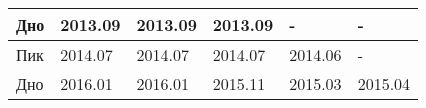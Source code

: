 \documentclass[a4paper,14pt]{extreport}
\begin{document}
\begin{table}[]
\begin{tabular}{|l|l|l|l|l|l|}
				Дно                                                                                                   & 2013.09                                                                                                                                                    & 2013.09                                                                    & 2013.09                                                                          & -                                                                         & -                                                                                \\ \hline
				Пик                                                                                                   & 2014.07                                                                                                                                                    & 2014.07                                                                    & 2014.07                                                                          & 2014.06                                                                   & -                                                                                \\
				Дно                                                                                                   & 2016.01                                                                                                                                                    & 2016.01                                                                    & 2015.11                                                                          & 2015.03                                                                   & 2015.04                                                                          \\ \hline
			\end{tabular}
		\label{tbl:tpoints_re}	
	\end{table}
	
\end{document}
